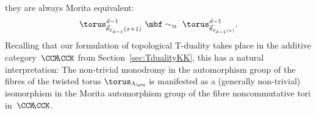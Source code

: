 \begin{Remark}
they are always Morita
equivalent:
\[
\torus^{d-1}_{\vec\theta_{\vec e_{d-1}}(x+1)} \ \mbf\sim_{\text{\tiny
 M}} \ \torus^{d-1}_{\vec\theta_{\vec e_{d-1}(x)}} .
\]
Recalling that our formulation of topological T-duality takes place in the additive category~${\CCK\hspace{-1mm}\CCK}$ from
Section~\ref{sec:TdualityKK}, this has a natural interpretation: The
non-trivial monodromy in the automorphism group of the~ fibres of the
twisted torus $\torus_{\Lambda_\sfG}$ is
manifested as a (generally non-trivial) isomorphism in the Morita automorphism
group of the fibre noncommutative tori in~${\CCK\hspace{-1mm}\CCK}$.
\end{Remark}

